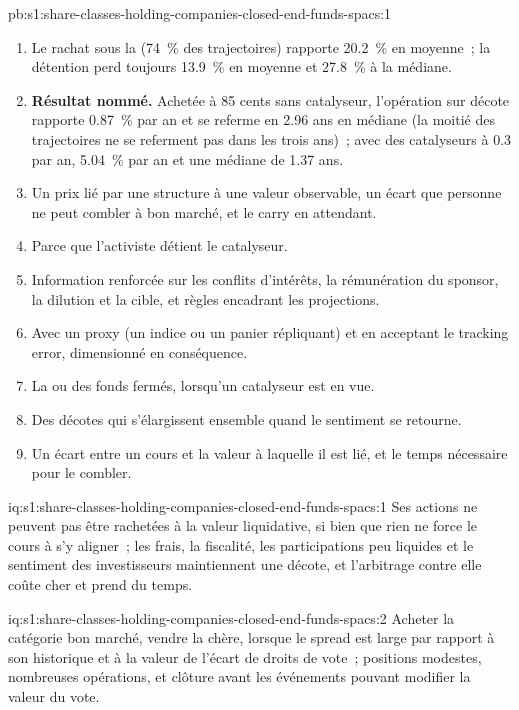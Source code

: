 \begin{solution}{pb:s1:share-classes-holding-companies-closed-end-funds-spacs:1}
\begin{enumerate}
\item Le rachat sous la  (74~\% des trajectoires) rapporte 20.2~\% en moyenne~; la détention perd toujours 13.9~\% en moyenne et 27.8~\% à la médiane.
\item \textbf{Résultat nommé.} Achetée à 85 cents sans catalyseur, l'opération sur décote rapporte 0.87~\% par an et se referme en 2.96 ans en médiane (la moitié des trajectoires ne
se referment pas dans les trois ans)~; avec des catalyseurs à 0.3 par an, 5.04~\% par an et une médiane de 1.37 ans.
\item Un prix lié par une structure à une valeur observable, un écart que personne ne peut combler à bon marché, et le carry en attendant.
\item Parce que l'activiste détient le catalyseur.
\item Information renforcée sur les conflits d'intérêts, la rémunération du sponsor, la dilution et la cible, et règles encadrant les projections.
\item Avec un proxy (un indice ou un panier répliquant) et en acceptant le tracking error, dimensionné en conséquence.
\item La  ou des fonds fermés, lorsqu'un catalyseur est en vue.
\item Des décotes qui s'élargissent ensemble quand le sentiment se retourne.
\item Un écart entre un cours et la valeur à laquelle il est lié, et le temps nécessaire pour le combler.
\end{enumerate}
\end{solution}

\begin{solution}{iq:s1:share-classes-holding-companies-closed-end-funds-spacs:1}
Ses actions ne peuvent pas être rachetées à la valeur liquidative, si bien que rien ne force le cours à s'y aligner~; les frais, la fiscalité, les participations peu liquides et le sentiment des investisseurs maintiennent une
décote, et l'arbitrage contre elle coûte cher et prend du temps.
\end{solution}

\begin{solution}{iq:s1:share-classes-holding-companies-closed-end-funds-spacs:2}
Acheter la catégorie bon marché, vendre la chère, lorsque le spread est large par rapport à son historique et à la valeur de l'écart de droits de vote~; positions modestes, nombreuses
opérations, et clôture avant les événements pouvant modifier la valeur du vote.
\end{solution}

